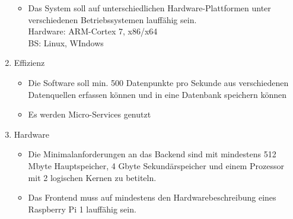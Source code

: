\begin{enumerate}
    \begin{itemize}
        \item Das System soll auf unterschiedlichen Hardware-Plattformen unter verschiedenen Betriebssystemen lauffähig sein.
        \\Hardware: ARM-Cortex 7, x86/x64
          \\  BS: Linux, WIndows
    \end{itemize}
    \item Effizienz
    \begin{itemize}
        \item Die Software soll min. 500 Datenpunkte pro Sekunde aus verschiedenen Datenquellen erfassen können und in eine Datenbank speichern können 
        \item Es werden Micro-Services genutzt
    \end{itemize}
    \item Hardware
    \begin{itemize}
        \item Die Minimalanforderungen an das Backend sind mit mindestens 512 Mbyte Hauptspeicher, 4 Gbyte Sekundärspeicher und einem Prozessor mit 2 logischen Kernen zu betiteln.
        \item Das Frontend muss auf mindestens den Hardwarebeschreibung eines Raspberry Pi 1 lauffähig sein. 
    \end{itemize}
\end{enumerate}

